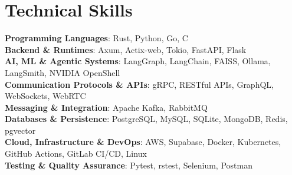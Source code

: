 \documentclass[letterpaper,11pt]{article}
\begin{document}
%
\section{Technical Skills}
 \begin{itemize}[leftmargin=0.15in, label={}]
    \small{\item{
        \textbf{Programming Languages}{: Rust, Python, Go, C} \\
        \textbf{Backend \& Runtimes}{: Axum, Actix-web, Tokio, FastAPI, Flask} \\
        \textbf{AI, ML \& Agentic Systems}{: LangGraph, LangChain, FAISS, Ollama, LangSmith, NVIDIA OpenShell} \\
        \textbf{Communication Protocols \& APIs}{: gRPC, RESTful APIs, GraphQL, WebSockets, WebRTC} \\
        \textbf{Messaging \& Integration}{: Apache Kafka, RabbitMQ} \\
        \textbf{Databases \& Persistence}{: PostgreSQL, MySQL, SQLite, MongoDB, Redis, pgvector} \\
        \textbf{Cloud, Infrastructure \& DevOps}{: AWS, Supabase, Docker, Kubernetes, GitHub Actions, GitLab CI/CD, Linux} \\
        \textbf{Testing \& Quality Assurance}{: Pytest, rstest, Selenium, Postman} \\
    }}
 \end{itemize}


\end{document}
